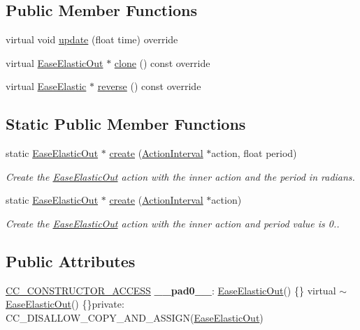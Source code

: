 \subsection*{Public Member Functions}
\begin{DoxyCompactItemize}
\item 
virtual void \hyperlink{classEaseElasticOut_a37dea32a0e909747540cc5625cd7893a}{update} (float time) override
\item 
virtual \hyperlink{classEaseElasticOut}{Ease\+Elastic\+Out} $\ast$ \hyperlink{classEaseElasticOut_a1f1e56422100f620e725ec11c595e1f2}{clone} () const override
\item 
virtual \hyperlink{classEaseElastic}{Ease\+Elastic} $\ast$ \hyperlink{classEaseElasticOut_a3da4544ffa360bd28296d2e120b2fdc9}{reverse} () const override
\end{DoxyCompactItemize}
\subsection*{Static Public Member Functions}
\begin{DoxyCompactItemize}
\item 
static \hyperlink{classEaseElasticOut}{Ease\+Elastic\+Out} $\ast$ \hyperlink{classEaseElasticOut_a417951cd2049c51c27779ed8b7067c42}{create} (\hyperlink{classActionInterval}{Action\+Interval} $\ast$action, float period)
\begin{DoxyCompactList}\small\item\em Create the \hyperlink{classEaseElasticOut}{Ease\+Elastic\+Out} action with the inner action and the period in radians. \end{DoxyCompactList}\item 
static \hyperlink{classEaseElasticOut}{Ease\+Elastic\+Out} $\ast$ \hyperlink{classEaseElasticOut_a82a88455e85f749ac5d657f898f1b41d}{create} (\hyperlink{classActionInterval}{Action\+Interval} $\ast$action)
\begin{DoxyCompactList}\small\item\em Create the \hyperlink{classEaseElasticOut}{Ease\+Elastic\+Out} action with the inner action and period value is 0.. \end{DoxyCompactList}\end{DoxyCompactItemize}
\subsection*{Public Attributes}
\begin{DoxyCompactItemize}
\item 
\mbox{\label{classEaseElasticOut_a1f0487ca0930808b8f478fa97071b043}} 
\hyperlink{_2cocos2d_2cocos_2base_2ccConfig_8h_a25ef1314f97c35a2ed3d029b0ead6da0}{C\+C\+\_\+\+C\+O\+N\+S\+T\+R\+U\+C\+T\+O\+R\+\_\+\+A\+C\+C\+E\+SS} {\bfseries \+\_\+\+\_\+pad0\+\_\+\+\_\+}\+: \hyperlink{classEaseElasticOut}{Ease\+Elastic\+Out}() \{\} virtual $\sim$\hyperlink{classEaseElasticOut}{Ease\+Elastic\+Out}() \{\}private\+: C\+C\+\_\+\+D\+I\+S\+A\+L\+L\+O\+W\+\_\+\+C\+O\+P\+Y\+\_\+\+A\+N\+D\+\_\+\+A\+S\+S\+I\+GN(\hyperlink{classEaseElasticOut}{Ease\+Elastic\+Out})
\end{DoxyCompactItemize}
